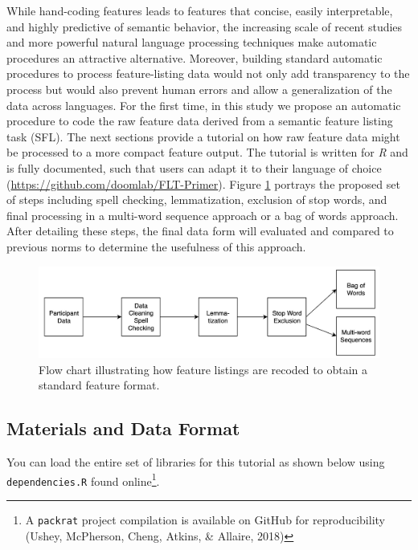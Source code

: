 \documentclass[man]{apa6}
\let\rmarkdownfootnote\footnote%
\def\footnote{\protect\rmarkdownfootnote}
\begin{document}
While hand-coding features leads to features that concise, easily interpretable, and highly predictive of semantic behavior, the increasing scale of recent studies and more powerful natural language processing techniques make automatic procedures an attractive alternative. Moreover, building standard automatic procedures to process feature-listing data would not only add transparency to the process but would also prevent human errors and allow a generalization of the data across languages. For the first time, in this study we propose an automatic procedure to code the raw feature data derived from a semantic feature listing task (SFL). The next sections provide a tutorial on how raw feature data might be processed to a more compact feature output. The tutorial is written for \emph{R} and is fully documented, such that users can adapt it to their language of choice (\url{https://github.com/doomlab/FLT-Primer}). Figure \ref{fig:flowchart} portrays the proposed set of steps including spell checking, lemmatization, exclusion of stop words, and final processing in a multi-word sequence approach or a bag of words approach. After detailing these steps, the final data form will evaluated and compared to previous norms to determine the usefulness of this approach.

\begin{figure}
\includegraphics[width=5.24in]{flow_chart} \caption{Flow chart illustrating how feature listings are recoded to obtain a standard feature format.}\label{fig:flowchart}
\end{figure}

\hypertarget{materials-and-data-format}{%
\subsection{Materials and Data Format}\label{materials-and-data-format}}

You can load the entire set of libraries for this tutorial as shown below using \texttt{dependencies.R} found online\footnote{A \texttt{packrat} project compilation is available on GitHub for reproducibility (Ushey, McPherson, Cheng, Atkins, \& Allaire, 2018)}.
\end{document}
